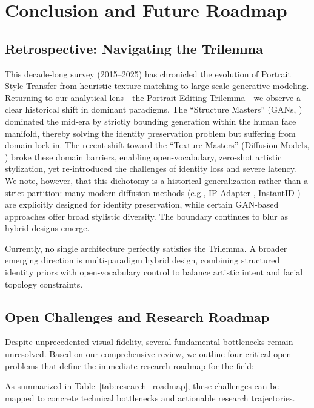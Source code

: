 \documentclass[journal]{IEEEtran}
\begin{document}
\section{Conclusion and Future Roadmap}
\label{sec:conclusion}

\subsection{Retrospective: Navigating the Trilemma}
\label{sec:conclusion:retrospective}
This decade-long survey (2015--2025) has chronicled the evolution of Portrait Style Transfer from heuristic texture matching to large-scale generative modeling. Returning to our analytical lens---the Portrait Editing Trilemma---we observe a clear historical shift in dominant paradigms. The ``Structure Masters'' (GANs, \cite{karras2019style}) dominated the mid-era by strictly bounding generation within the human face manifold, thereby solving the identity preservation problem but suffering from domain lock-in. The recent shift toward the ``Texture Masters'' (Diffusion Models, \cite{ho2020denoising,rombach_2022_cvpr}) broke these domain barriers, enabling open-vocabulary, zero-shot artistic stylization, yet re-introduced the challenges of identity loss and severe latency. We note, however, that this dichotomy is a historical generalization rather than a strict partition: many modern diffusion methods (e.g., IP-Adapter \cite{ye2023ipadapter}, InstantID \cite{wang2024instantid}) are explicitly designed for identity preservation, while certain GAN-based approaches offer broad stylistic diversity. The boundary continues to blur as hybrid designs emerge.

Currently, no single architecture perfectly satisfies the Trilemma. A broader emerging direction is multi-paradigm hybrid design, combining structured identity priors with open-vocabulary control to balance artistic intent and facial topology constraints.

\subsection{Open Challenges and Research Roadmap}
\label{sec:conclusion:roadmap}
Despite unprecedented visual fidelity, several fundamental bottlenecks remain unresolved. Based on our comprehensive review, we outline four critical open problems that define the immediate research roadmap for the field:

As summarized in Table~\ref{tab:research_roadmap}, these challenges can be mapped to concrete technical bottlenecks and actionable research trajectories.
\end{document}

